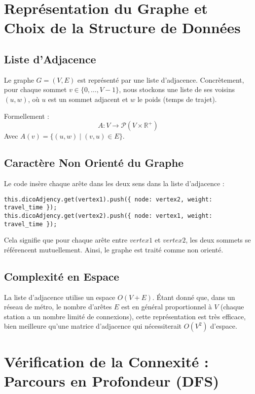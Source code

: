 \documentclass[a4paper,12pt]{article}
\begin{document}
\section{Représentation du Graphe et Choix de la Structure de Données}

\subsection{Liste d’Adjacence}

Le graphe $G=(V,E)$ est représenté par une liste d’adjacence. Concrètement, pour chaque sommet $v \in \{0,\dots,V-1\}$, nous stockons une liste de ses voisins $(u,w)$, où $u$ est un sommet adjacent et $w$ le poids (temps de trajet).

Formellement :
\[
A : V \to \mathcal{P}(V \times \mathbb{R}^+)
\]
Avec $A(v) = \{(u,w) \mid (v,u) \in E \}$.

\subsection{Caractère Non Orienté du Graphe}

Le code insère chaque arête dans les deux sens dans la liste d’adjacence :
\begin{verbatim}
this.dicoAdjency.get(vertex1).push({ node: vertex2, weight: travel_time });
this.dicoAdjency.get(vertex2).push({ node: vertex1, weight: travel_time });
\end{verbatim}

Cela signifie que pour chaque arête entre $vertex1$ et $vertex2$, les deux sommets se référencent mutuellement. Ainsi, le graphe est traité comme non orienté.

\subsection{Complexité en Espace}

La liste d’adjacence utilise un espace $O(V+E)$. Étant donné que, dans un réseau de métro, le nombre d’arêtes $E$ est en général proportionnel à $V$ (chaque station a un nombre limité de connexions), cette représentation est très efficace, bien meilleure qu’une matrice d’adjacence qui nécessiterait $O(V^2)$ d’espace.

\section{Vérification de la Connexité : Parcours en Profondeur (DFS)}
\end{document}
